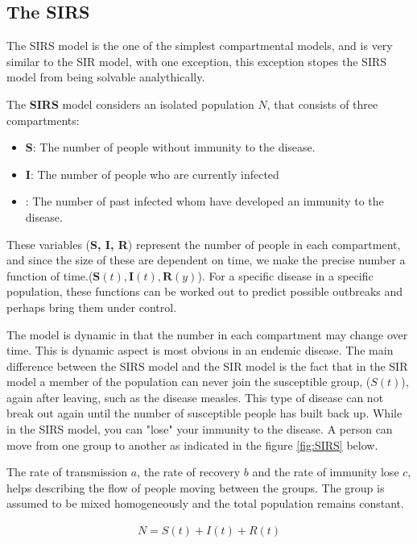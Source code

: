 \subsection{The SIRS}
The SIRS model is the one of the simplest compartmental models, and is very similar to the SIR model, with one exception, this exception stopes the SIRS model from being solvable analythically.

The \textbf{SIRS} model considers an isolated population $N$, that consists of three compartments:
\begin{itemize}
\item \textbf{S}: The number of people without immunity to the disease. 
\item \textbf{I}: The number of people who are currently infected
\item {}: The number of past infected whom have developed an immunity to the disease.
\end{itemize}\label{table:1}

These variables (\textbf{S, I, R}) represent the number of people in each compartment, and since the size of these are dependent on time, we make the precise number a function of time.($ \textbf{S}(t), \textbf{I}(t), \textbf{R}(y)$). For a specific disease in a specific population, these functions can be worked out to predict possible outbreaks and perhaps bring them under control. 

The model is dynamic in that the number in each compartment may change over time. This is dynamic aspect is most obvious in an endemic disease. The main difference between the SIRS model and the SIR model is the fact that in the SIR model a member of the population can never join the susceptible group, ($S(t)$), again after leaving, such as the disease measles. This type of disease can not break out again until the number of susceptible people has built back up. While in the SIRS model, you can "lose" your immunity to the disease. A person can move from one group to another as indicated in the figure \ref{fig:SIRS} below.

	The rate of transmission $a$, the rate of recovery $b$ and the rate of immunity lose $c$, helps describing the flow of people moving between the groups. The group is assumed to be mixed homogeneously and the total population remains constant.
	
\begin{align}
N = S(t) + I(t) + R(t) 
\end{align}
	
